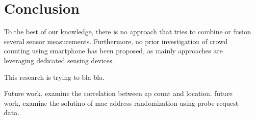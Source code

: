 \chapter{Conclusion}\label{ch:conclusion} %
To the best of our knowledge, there is no approach that tries to combine or fusion several sensor measurements. Furthermore, no prior investigation of crowd counting using smartphone has been proposed, as mainly approaches are leveraging dedicated sensing devices.

This research is trying to bla bla.

Future work, examine the correlation between ap count and location.
future work, examine the solutino of mac address randomization using probe request data.

